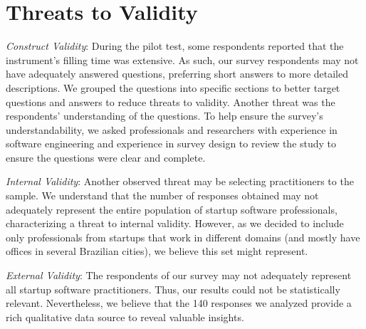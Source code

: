 \documentclass[runningheads]{llncs}
\begin{document}
{%
}

\section{Threats to Validity} 
\label{section:threats}

\textit{Construct Validity}: During the pilot test, some respondents reported that the instrument's filling time was extensive. As such, our survey respondents may not have adequately answered questions, preferring short answers to more detailed descriptions. We grouped the questions into specific sections to better target questions and answers to reduce threats to validity. Another threat was the respondents' understanding of the questions. To help ensure the survey's understandability, we asked professionals and researchers with experience in software engineering and experience in survey design to review the study to ensure the questions were clear and complete.

\textit{Internal Validity}: Another observed threat may be selecting practitioners to the sample. We understand that the number of responses obtained may not adequately represent the entire population of startup software professionals, characterizing a threat to internal validity. However, as we decided to include only professionals from startups that work in different domains (and mostly have offices in several Brazilian cities), we believe this set might represent. 

\textit{External Validity}: The respondents of our survey may not adequately represent all startup software practitioners. Thus, our results could not be statistically relevant. Nevertheless, we believe that the 140 responses we analyzed provide a rich qualitative data source to reveal valuable insights.
\end{document}
